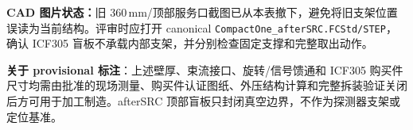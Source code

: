 \documentclass[UTF8,10pt,letterpaper,fontset=none]{ctexart}
\begin{document}
\begin{tcolorbox}[colback=white,colframe=SheetBlue!35,boxsep=4pt,left=8pt,right=8pt,top=4pt,bottom=4pt]
\sffamily\small
\textbf{CAD 图片状态：}旧 360\,mm/顶部服务口截图已从本表撤下，避免将旧支架位置误读为当前结构。评审时应打开 canonical \texttt{CompactOne\_afterSRC.FCStd/STEP}，确认 ICF305 盲板不承载内部支架，并分别检查固定支撑和完整取出动作。
\end{tcolorbox}

\begin{tcolorbox}[colback=SheetLight,colframe=SheetBlue!30,boxsep=4pt,left=8pt,right=8pt,top=4pt,bottom=4pt]
\sffamily\small\color{SheetMuted}
\textbf{关于 provisional 标注}：上述壁厚、束流接口、旋转/信号馈通和 ICF305 购买件尺寸均需由批准的现场测量、购买件认证图纸、外压结构计算和完整拆装验证关闭后方可用于加工制造。afterSRC 顶部盲板只封闭真空边界，不作为探测器支架或定位基准。
\end{tcolorbox}

%
\end{document}
